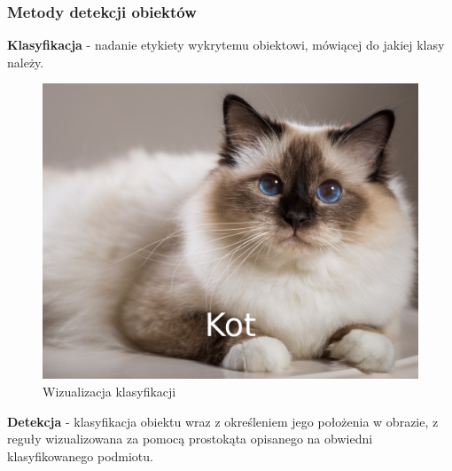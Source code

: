 \subsubsection{Metody detekcji obiektów}
\begin{description}
\item \textbf{Klasyfikacja} - nadanie etykiety wykrytemu obiektowi, mówiącej do jakiej klasy należy.  

\begin{figure}[h!]
    \begin{center}
        \includegraphics[scale=0.5]{img/kot.jpg}
    \end{center}
    \caption{Wizualizacja klasyfikacji\protect\footnotemark}
    \label{fig:classification_cat}
\end{figure}


\item \textbf{Detekcja} - klasyfikacja obiektu wraz z określeniem jego położenia w obrazie, z reguły wizualizowana za pomocą prostokąta opisanego na obwiedni klasyfikowanego podmiotu.


\end{description}
